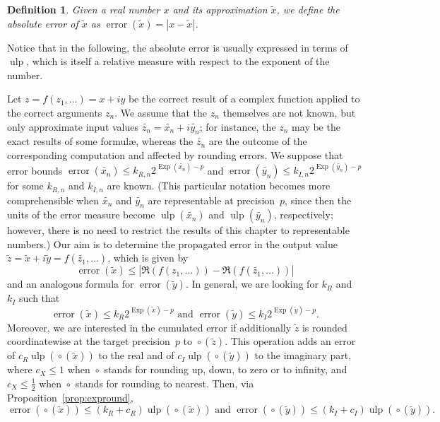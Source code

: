 \documentclass [11pt]{article}
\newcommand {\corr}[1]{{#1}}
\newcommand {\appro}[1]{\widetilde {#1}}
\newcommand {\Ulp}{{\operatorname {ulp}}}
\DeclareMathOperator{\Exp}{\operatorname {Exp}}
\newcommand{\error}{\operatorname {error}}
\newcommand {\round}{\operatorname {\circ}}
\renewcommand {\leq}{\leqslant}
\newtheorem{definition}[theorem]{Definition}
\begin{document}
\begin {definition}
\label {def:error}
Given a real number $\corr x$ and its approximation $\appro x$,
we define the {\em absolute error} of $\appro x$ as
$\error (\appro x) = | \corr x - \appro x |$.
\end {definition}

Notice that in the following, the absolute error is usually expressed in terms
of $\Ulp$, which is itself a relative measure with respect to the exponent of
the number.

Let $\corr z = f (\corr {z_1}, \ldots) = \corr x + i \corr y$ be the correct
result of a complex function applied to the correct arguments $\corr {z_n}$.
We assume that the $\corr {z_n}$ themselves are not known, but only
approximate input values $\appro {z_n} = \appro {x_n} + i \appro {y_n}$;
for instance, the $\corr {z_n}$ may be the exact results of some formul\ae,
whereas the $\appro {z_n}$ are the outcome of the corresponding computation
and affected by rounding errors. We suppose that error bounds
$\error (\appro {x_n}) \leq k_{R, n} 2^{\Exp (\appro {x_n}) - p}$
and $\error (\appro {y_n}) \leq k_{I, n} 2^{\Exp (\appro {y_n}) - p}$ for
some $k_{R, n}$ and $k_{I, n}$ are known. (This particular notation
becomes more comprehensible when $\appro {x_n}$ and $\appro {y_n}$ are
representable at precision~$p$, since then the units of the error measure
become $\Ulp (\appro {x_n})$ and $\Ulp (\appro {y_n})$, respectively;
however, there is no need to restrict the results of this chapter to
representable numbers.)
Our aim is to determine the propagated error in the output value
$\appro z = \appro x + i \appro y = f (\appro {z_1}, \ldots)$, which is given by
\begin {equation}
\label {eq:properror}
\error (\appro x)
\leq | \Re (f (\corr {z_1}, \ldots)) - \Re (f (\appro {z_1}, \ldots)) |
\end {equation}
and an analogous formula for $\error (\appro y)$. In general,
we are looking for $k_R$ and $k_I$ such that
\[
\error (\appro x) \leq k_R 2^{\Exp (\appro x) - p}
\text { and }
\error (\appro y) \leq k_I 2^{\Exp (\appro y) - p}.
\]
Moreover, we are interested in the cumulated error if additionally
$\appro z$ is rounded coordinatewise at the target precision~$p$
to $\round (\appro z)$. This operation adds an error of
$c_R \Ulp (\round (\appro x))$ to the real and of
$c_I \Ulp (\round (\appro y))$ to the imaginary part, where
$c_X \leq 1$ when $\round$ stands for rounding up, down, to zero or
to infinity, and $c_X \leq \frac {1}{2}$ when $\round$ stands for
rounding to nearest.
Then, via Proposition~\ref {prop:expround},
\[
\error (\round (\appro x)) \leq (k_R + c_R) \Ulp (\round (\appro x))
\text { and }
\error (\round (\appro y)) \leq (k_I + c_I) \Ulp (\round (\appro y)).
\]
\end{document}
